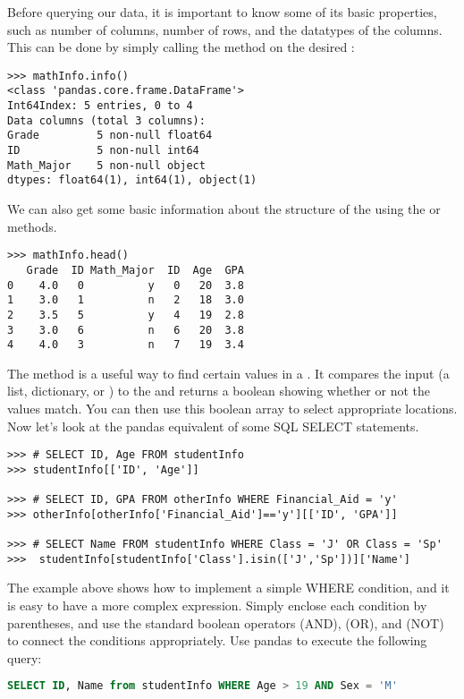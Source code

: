 Before querying our data, it is important to know some of its basic properties,
such as number of columns, number of rows, and the datatypes of the columns.
This can be done by simply calling the  method on the desired
:

\begin{lstlisting}
>>> mathInfo.info()
<class 'pandas.core.frame.DataFrame'>
Int64Index: 5 entries, 0 to 4
Data columns (total 3 columns):
Grade         5 non-null float64
ID            5 non-null int64
Math_Major    5 non-null object
dtypes: float64(1), int64(1), object(1)
\end{lstlisting}

We can also get some basic information about the structure of the 
using the  or  methods.

\begin{lstlisting}
>>> mathInfo.head()
   Grade  ID Math_Major  ID  Age  GPA
0    4.0   0          y   0   20  3.8
1    3.0   1          n   2   18  3.0
2    3.5   5          y   4   19  2.8
3    3.0   6          n   6   20  3.8
4    4.0   3          n   7   19  3.4
\end{lstlisting}

The method  is a useful way to find certain values in a
.
 It compares the input (a list, dictionary, or )
to the  and returns a boolean  showing whether or
not the values match.
You can then use this boolean array to select appropriate
locations.
Now let's look at the pandas equivalent of some SQL SELECT statements.
\begin{lstlisting}
>>> # SELECT ID, Age FROM studentInfo
>>> studentInfo[['ID', 'Age']]

>>> # SELECT ID, GPA FROM otherInfo WHERE Financial_Aid = 'y'
>>> otherInfo[otherInfo['Financial_Aid']=='y'][['ID', 'GPA']]

>>> # SELECT Name FROM studentInfo WHERE Class = 'J' OR Class = 'Sp'
>>>  studentInfo[studentInfo['Class'].isin(['J','Sp'])]['Name']
\end{lstlisting}

\begin{problem}
The example above shows how to implement a simple WHERE condition, and it is easy
to have a more complex expression.
Simply enclose each condition by parentheses,
and use the standard boolean operators \li{\&} (AND), \li{\|} (OR), and \li{\~} (NOT) to
connect the conditions appropriately.
Use pandas to execute the following query:
\begin{lstlisting}[language=SQL]
SELECT ID, Name from studentInfo WHERE Age > 19 AND Sex = 'M'
\end{lstlisting}
\end{problem}

